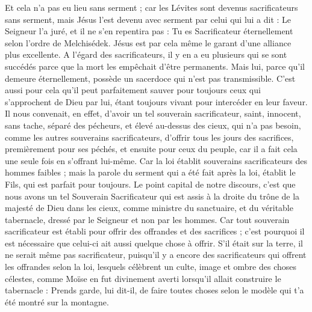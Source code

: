 \begin{multicols}{2}
Et cela n’a pas eu lieu sans serment ;
car les Lévites sont devenus sacrificateurs sans serment, mais Jésus l’est devenu avec serment par celui qui lui a dit : Le Seigneur l'a juré, et il ne s'en repentira pas : Tu es Sacrificateur éternellement selon l'ordre de Melchisédek.
Jésus est par cela même le garant d’une alliance plus excellente.
A l’égard des sacrificateurs, il y en a eu plusieurs qui se sont succédés parce que la mort les empêchait d’être permanents.
Mais lui, parce qu'il demeure éternellement, possède un sacerdoce qui n’est pas transmissible.
C'est aussi pour cela qu’il peut parfaitement sauver pour toujours ceux qui s'approchent de Dieu par lui, étant toujours vivant pour intercéder en leur faveur.
Il nous convenait, en effet, d'avoir un tel souverain sacrificateur, saint, innocent, sans tache, séparé des pécheurs, et élevé au-dessus des cieux,
qui n’a pas besoin, comme les autres souverains sacrificateurs, d'offrir tous les jours des sacrifices, premièrement pour ses péchés, et ensuite pour ceux du peuple, car il a fait cela une seule fois en s’offrant lui-même.
Car la loi établit souverains sacrificateurs des hommes faibles ; mais la parole du serment qui a été fait après la loi, établit le Fils, qui est parfait pour toujours.
\VerseOne{}Le point capital de notre discours, c'est que nous avons un tel Souverain Sacrificateur qui est assis à la droite du trône de la majesté de Dieu dans les cieux,
comme ministre du sanctuaire, et du véritable tabernacle, dressé par le Seigneur et non par les hommes.
Car tout souverain sacrificateur est établi pour offrir des offrandes et des sacrifices ; c'est pourquoi il est nécessaire que celui-ci ait aussi quelque chose à offrir.
S’il était sur la terre, il ne serait même pas sacrificateur, puisqu’il y a encore des sacrificateurs qui offrent les offrandes selon la loi,
lesquels célèbrent un culte, image et ombre des choses célestes, comme Moïse en fut divinement averti lorsqu’il allait construire le tabernacle : Prends garde, lui dit-il, de faire toutes choses selon le modèle qui t'a été montré sur la montagne.

\end{multicols}
